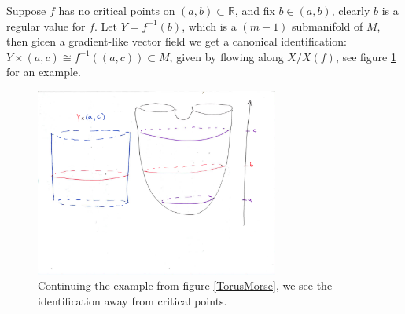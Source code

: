 \documentclass{article}
\newtheorem{proposed work}[theorem]{Proposed Work}
\begin{document}
Suppose $f$ has no critical points on $(a,b)\subset \mathbb{R}$, and fix $b\in (a,b)$, clearly $b$ is a regular value for $f$. Let $Y=f^{-1}(b)$, which is a $(m-1)$ submanifold of $M$, then gicen a gradient-like vector field we get a canonical identification: $Y\times (a,c)\cong f^{-1}((a,c))\subset M$, given by flowing along $X/X(f)$, see figure \ref{nocritpt} for an example.
\begin{figure}[h]
\includegraphics[width=8cm]{nocritpt.pdf}
\caption{Continuing the example from figure \ref{TorusMorse}, we see the identification away from critical points. \label{nocritpt}}
\end{figure}
\end{document}

